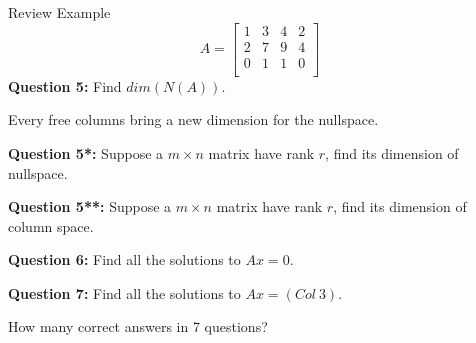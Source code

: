 \documentclass{beamer}
\begin{document}
\begin{frame}{Review Example}
\begin{equation*}
    A=\left[ \begin{matrix}
        1&		3&		4&		2\\
        2&		7&		9&		4\\
        0&		1&		1&		0\\
    \end{matrix} \right]
\end{equation*}
\textbf{Question 5:} Find $dim(N(A))$.

\vspace{3pt}
Every free columns bring a new dimension for the nullspace.

\vspace{5pt}
\textbf{Question 5*:} Suppose a $m \times n$ matrix have rank $r$, find its dimension of nullspace.

\vspace{5pt}
\textbf{Question 5**:} Suppose a $m \times n$ matrix have rank $r$, find its dimension of column space.

\vspace{5pt}
\textbf{Question 6:} Find all the solutions to $Ax=0$.

\vspace{5pt}
\textbf{Question 7:} Find all the solutions to $Ax=(Col\:3)$.

\vspace{3pt}
How many correct answers in 7 questions?
\end{frame}
\end{document}
